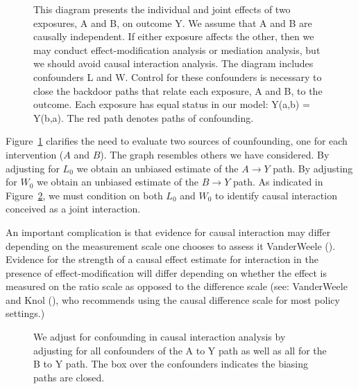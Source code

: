 \documentclass[
  singlecolumn]{article}
\begin{document}
\begin{figure}


\caption{\label{fig-dag-interaction}This diagram presents the individual
and joint effects of two exposures, A and B, on outcome Y. We assume
that A and B are causally independent. If either exposure affects the
other, then we may conduct effect-modification analysis or mediation
analysis, but we should avoid causal interaction analysis. The diagram
includes confounders L and W. Control for these confounders is necessary
to close the backdoor paths that relate each exposure, A and B, to the
outcome. Each exposure has equal status in our model: Y(a,b) = Y(b,a).
The red path denotes paths of confounding.}

\end{figure}%

Figure~\ref{fig-dag-interaction} clarifies the need to evaluate two
sources of counfounding, one for each intervention (\(A\) and \(B\)).
The graph resembles others we have considered. By adjusting for
\(L_{0}\) we obtain an unbiased estimate of the \(A\to Y\) path. By
adjusting for \(W_{0}\) we obtain an unbiased estimate of the \(B\to Y\)
path. As indicated in Figure~\ref{fig-dag-interaction-solved}, we must
condition on both \(L_{0}\) and \(W_{0}\) to identify causal interaction
conceived as a joint interaction.

An important complication is that evidence for causal interaction may
differ depending on the measurement scale one chooses to assess it
VanderWeele (). Evidence for the
strength of a causal effect estimate for interaction in the presence of
effect-modification will differ depending on whether the effect is
measured on the ratio scale as opposed to the difference scale (see:
VanderWeele and Knol (), who
recommends using the causal difference scale for most policy settings.)

\begin{figure}


\caption{\label{fig-dag-interaction-solved}We adjust for confounding in
causal interaction analysis by adjusting for all confounders of the A to
Y path as well as all for the B to Y path. The box over the confounders
indicates the biasing paths are closed.}

\end{figure}%
\end{document}
